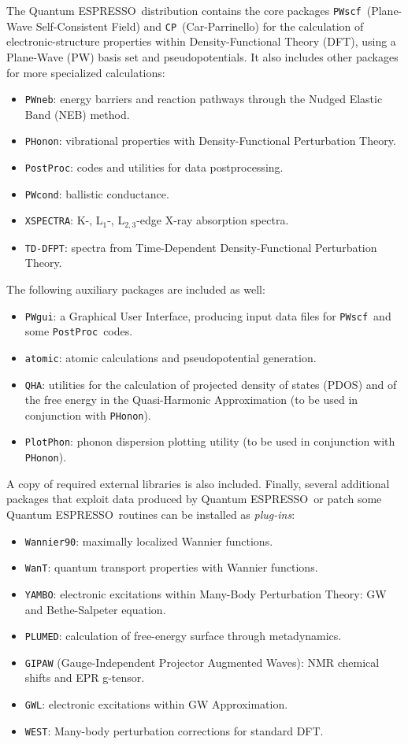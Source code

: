 \documentclass[12pt,a4paper]{article}
\def\qe{{\sc Quantum ESPRESSO}}
\def\PWscf{\texttt{PWscf}}
\def\PHonon{\texttt{PHonon}}
\def\CP{\texttt{CP}}
\def\PostProc{\texttt{PostProc}}
\def\NEB{\texttt{PWneb}} %
\begin{document}
The \qe\ distribution contains the core packages \PWscf\ (Plane-Wave
Self-Consistent Field) and \CP\ (Car-Parrinello) for the calculation
of electronic-structure properties within
Density-Functional Theory (DFT), using a Plane-Wave (PW) basis set
and pseudopotentials. It also includes other packages for
more specialized calculations:
\begin{itemize}
  \item \NEB:
        energy barriers and reaction pathways through the Nudged Elastic Band
        (NEB) method.
  \item \PHonon:
        vibrational properties  with Density-Functional Perturbation Theory.
  \item \PostProc:
        codes and utilities for data postprocessing.
  \item \texttt{PWcond}:
        ballistic conductance.
  \item \texttt{XSPECTRA}:
        K-, L$_1$-, L$_{2,3}$-edge X-ray absorption spectra.
  \item \texttt{TD-DFPT}:
        spectra from Time-Dependent
        Density-Functional Perturbation Theory.
\end{itemize}
The following auxiliary packages are included as well:
\begin{itemize}
\item \texttt{PWgui}:
      a Graphical User Interface, producing input data files for
      \PWscf\ and some \PostProc\ codes.
\item \texttt{atomic}:
      atomic calculations and pseudopotential generation.
\item \texttt{QHA}:
      utilities for the calculation of projected density of states (PDOS)
      and of the free energy in the Quasi-Harmonic Approximation (to be
      used in conjunction with \PHonon).
\item \texttt{PlotPhon}:
      phonon dispersion plotting utility (to be
      used in conjunction with \PHonon).
\end{itemize}
A copy of required external libraries is also included.
Finally, several additional packages that exploit data produced by \qe\
or patch some \qe\ routines can be installed as {\em plug-ins}:
\begin{itemize}
\item \texttt{Wannier90}:
      maximally localized Wannier functions.
\item \texttt{WanT}:
      quantum transport properties with Wannier functions.
\item \texttt{YAMBO}:
      electronic excitations within Many-Body Perturbation Theory:
      GW and Bethe-Salpeter equation.
\item \texttt{PLUMED}:
      calculation of free-energy surface through metadynamics.
\item \texttt{GIPAW} (Gauge-Independent Projector Augmented Waves):
      NMR chemical shifts and EPR g-tensor.
\item \texttt{GWL}: electronic excitations within GW Approximation.
\item \texttt{WEST}: Many-body perturbation corrections for standard DFT.
\end{itemize}
\end{document}
